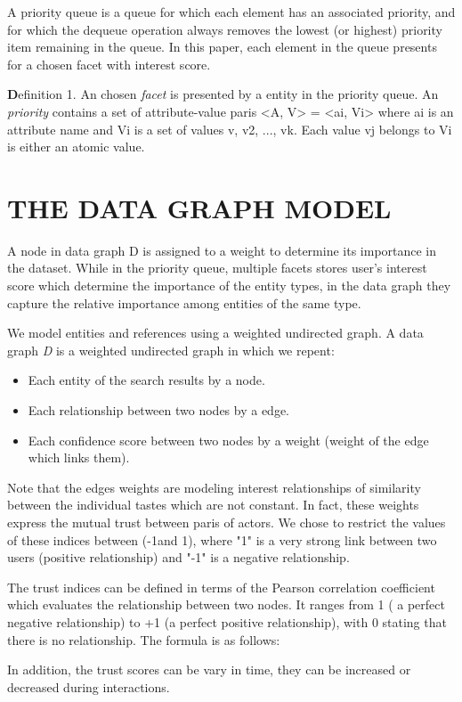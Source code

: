 A priority queue is a queue for which each element has an associated priority, and for which the dequeue operation always removes the lowest (or highest) priority item remaining in the queue. In this paper, each element in the queue presents for a chosen facet with interest score. 

{\textbf Definition 1.} An chosen {\it facet} is presented by a entity in the priority queue. An {\it priority} contains a set of attribute-value paris <A, V> = {<ai, Vi>} where ai is an attribute name and Vi is a set of values {v, v2, ..., vk}. Each value vj belongs to Vi is either an atomic value.

\section{THE DATA GRAPH MODEL}
A node in data graph D is assigned to a weight to determine its importance in the dataset. While in the priority queue, multiple facets stores user's interest score which determine the importance of the entity types, in the data graph they capture the relative importance among entities of the same type. 

We model entities and references using a weighted undirected graph. A data graph {\it D} is a weighted undirected graph in which we repent:
\begin{itemize}
	\item Each entity of the search results by a node.
	\item Each relationship between two nodes by a edge.
	\item Each confidence score between two nodes by a weight (weight of the edge which links them).
\end{itemize}
Note that the edges weights are modeling interest relationships of similarity between the individual tastes which are not constant. In fact, these weights express the mutual trust between paris of actors. We chose to restrict the values of these indices between (-1and 1), where "1" is a very strong link between two users (positive relationship) and "-1" is a negative relationship.

The trust indices can be defined in terms of the Pearson correlation coefficient \cite{Leung2007} which evaluates the relationship between two nodes. It ranges from 1 ( a perfect negative relationship) to +1 (a perfect positive relationship), with 0 stating that there is no relationship. The formula is as follows:

In addition, the trust scores can be vary in time, they can be increased or decreased during interactions.